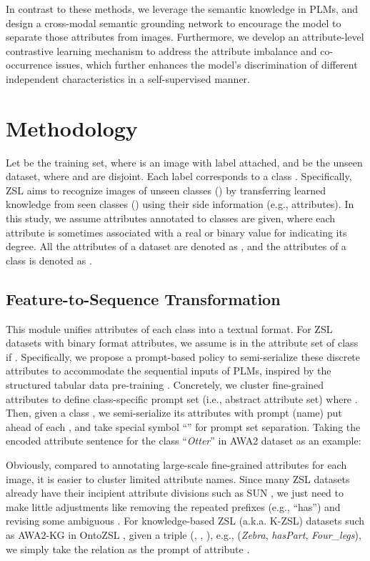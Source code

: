 \documentclass[letterpaper]{article} \usepackage{aaai23}  \usepackage{times}  \usepackage{helvet}  \usepackage{courier}  \usepackage[hyphens]{url}  \usepackage{graphicx} \urlstyle{rm} \def\UrlFont{\rm}  \usepackage{natbib}  \usepackage{caption} \frenchspacing  \setlength{\pdfpagewidth}{8.5in}  \setlength{\pdfpageheight}{11in}  \usepackage{algorithm}
\newcommand{\wen}[1]{{\color{black}#1}}
\newcommand{\fy}[1]{{\color{black}#1}}
\begin{document}
\fy{In contrast to these methods}, we leverage the semantic knowledge in PLMs, and design a cross-modal semantic grounding network to encourage the model to separate those attributes from images.
Furthermore, we develop an attribute-level contrastive learning mechanism to  address the attribute imbalance and co-occurrence issues, which further enhances the model's \fy{discrimination of} different independent characteristics in a self-supervised manner.




\section{Methodology}
Let  be the training set, where  is an image with label  attached, and  be the unseen dataset, where 
\wen{ and  are disjoint.}
Each label  corresponds to a class {.}
Speciﬁcally, ZSL aims to recognize images of 
unseen classes () by transferring learned knowledge from seen classes () using their {side information} (e.g., attributes).
{In this study, we assume attributes annotated to classes are given, where each attribute is sometimes associated with a real or binary value for indicating its degree.
All the attributes of a dataset are denoted as , 
\wen{and} 
the attributes of a class  is denoted as .}
\subsection{Feature-to-Sequence Transformation} \label{sec:FST}
\wen{This module unifies attributes of each class into a textual format. }
For ZSL datasets with binary format attributes,  we assume  is in the attribute set  of class  if .  
Specifically, 
we propose a prompt-based policy  to semi-serialize these discrete attributes \fy{to accommodate} the sequential input\fy{s} of PLMs, \wen{inspired by the structured tabular data pre-training \cite{DBLP:conf/acl/YinNYR20}}.
Concretely, we  cluster fine-grained attributes to define  
\wen{}
class-specific prompt  set  (i.e., abstract attribute set)  where .
Then, 
\wen{given a class ,}
we semi-serialize its attributes
with prompt (name) put ahead of each , and take special symbol ``'' for prompt set separation.
Taking the encoded  attribute sentence {} for the class ``\textit{Otter}'' in AWA2 \cite{DBLP:journals/pami/XianLSA19} dataset as an example:

Obviously, compared to annotating large-scale fine-grained attributes for each image, it is \fy{easier} to cluster limited attribute names.
Since many ZSL datasets already have their incipient attribute divisions such as SUN \cite{DBLP:conf/cvpr/PattersonH12}, we just need to make little adjustments like removing the repeated prefixes (e.g., ``has'') and revising some ambiguous .
For knowledge-based ZSL (a.k.a. K-ZSL) datasets  such as AWA2-KG in OntoZSL \cite{DBLP:conf/www/GengC0PYYJC21}, given a triple
\wen{(, , ), e.g., (\textit{Zebra}, \textit{hasPart}, \textit{Four_legs})}, 
we simply take the relation  as the prompt of attribute . 
\end{document}
